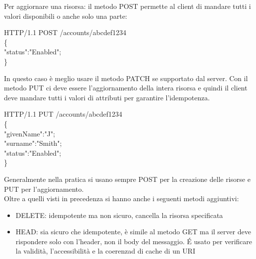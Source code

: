 Per aggiornare una risorsa: il metodo POST permette al client di mandare tutti i valori disponibili o anche solo una parte:
\begin{flushleft}
\hspace{1cm}HTTP/1.1 POST /accounts/abcdef1234\\
\hspace{1cm}\{\\
\hspace{2cm}"status":"Enabled";\\
\hspace{1cm}\}\\
\end{flushleft}
In questo caso è meglio usare il metodo PATCH se supportato dal server. Con il metodo PUT ci deve essere l'aggiornamento della intera risorsa e quindi il client deve mandare tutti i valori di attributi per garantire l'idempotenza. 
\begin{flushleft}
\hspace{1cm}HTTP/1.1 PUT /accounts/abcdef1234\\
\hspace{1cm}\{\\
\hspace{2cm}"givenName":"J";\\
\hspace{2cm}"surname":"Smith";\\
\hspace{2cm}"status":"Enabled";\\
\hspace{1cm}\}\\
\end{flushleft}

Generalmente nella pratica si usano sempre POST per la creazione delle risorse e PUT per l'aggiornamento.\\
Oltre a quelli visti in precedenza si hanno anche i seguenti metodi aggiuntivi:
\begin{itemize}
    \item DELETE: idempotente ma non sicuro, cancella la risorsa specificata
    \item HEAD: sia sicuro che idempotente, è simile al metodo GET ma il server deve rispondere solo con l'header, non il body del messaggio. \'E usato per verificare la validità, l'accessibilità e la coerenzad di cache di un URI
\end{itemize}

